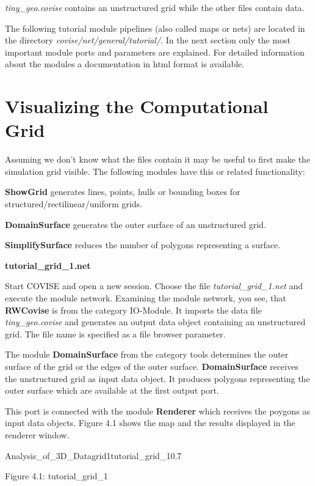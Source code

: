 {\it tiny\_geo.covise} contains an unstructured grid while the other files contain data.

The following tutorial module pipelines (also called maps or nets) are located in the 
directory {\it covise/net/general/tutorial/}. In the next section only the most 
important module ports and parameters are explained. For detailed information about the 
modules a documentation in html format is available. 


\clearpage
\section{Visualizing the Computational Grid}

Assuming we don't know what the files contain it may be useful to first make the 
simulation grid visible. The following modules have this or related functionality:

{\bf ShowGrid} generates lines, points, hulls or bounding boxes for 
structured/rectilinear/uniform grids.

{\bf DomainSurface} generates the outer surface of an unstructured grid.

{\bf SimplifySurface} reduces the number of polygons representing a surface.

\vspace{1cm}
\begin{Large}{\bf tutorial\_grid\_1.net}\end{Large}
\vspace{0.5cm}

Start COVISE and open a new session. Choose the file {\it tutorial\_grid\_1.net} and 
execute the module network. Examining the module network, you see, that {\bf RWCovise} 
is from the category IO-Module. It imports the data file {\it tiny\_geo.covise} and 
generates an output data object containing an unstructured grid. The file name is 
specified as a file browser parameter. 

The module {\bf DomainSurface} from the category tools determines the outer surface 
of the grid or the edges of the outer surface. {\bf DomainSurface} receives the 
unstructured grid as input data object. It produces polygons representing the
outer surface which are available at the first output port. 

This port is connected with the module {\bf Renderer} which receives the poygons as 
input data objects. Figure 4.1 shows the map and the results displayed in the renderer window.

\begin{covimg}{Analysis_of_3D_Data}{grid1}{tutorial\_grid\_1}{0.7}\end{covimg}
\begin{htmlonly}
Figure 4.1: tutorial_grid_1
\vspace{0.5cm}
\end{htmlonly}

